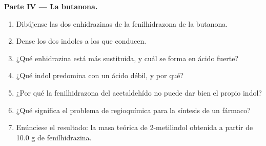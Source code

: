\begin{problem}
\medskip\noindent\textbf{Parte IV --- La butanona.}
\begin{enumerate}[resume]
  \item Dibújense las dos enhidrazinas de la fenilhidrazona de la butanona.
  \item Dense los dos indoles a los que conducen.
  \item ¿Qué enhidrazina está más sustituida, y cuál se forma en ácido fuerte?
  \item ¿Qué indol predomina con un ácido débil, y por qué?
  \item ¿Por qué la fenilhidrazona del acetaldehído no puede dar bien el propio indol?
  \item ¿Qué significa el problema de regioquímica para la síntesis de un fármaco?
  \item Enúnciese el resultado: la masa teórica de 2-metilindol obtenida a partir de 10.0 g de
        fenilhidrazina.
\end{enumerate}
\end{problem}
